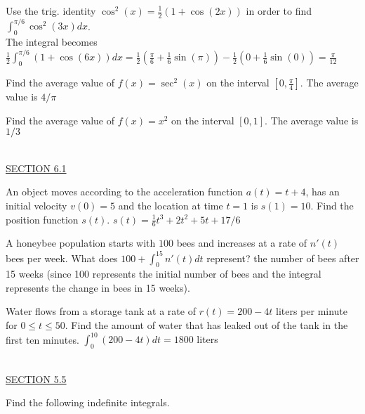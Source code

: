 \documentclass{exam}
\begin{document}
\begin{questions}
\question Use the trig. identity $\cos^2(x) = \frac{1}{2}\left( 1 + \cos(2x) \right)$ in order to find $\displaystyle\int_0^{\pi/6} \cos^2(3x) dx$.
\\  {\color{red} The integral becomes $\frac{1}{2}\displaystyle\int_0^{\pi/6} \left( 1 + \cos(6x) \right) dx  = \frac{1}{2} \left( \frac{\pi}{6} + \frac{1}{6}\sin(\pi)\right) - \frac{1}{2} \left( 0 + \frac{1}{6}\sin(0)\right) = \frac{\pi}{12} $}

\question Find the average value of $f(x)=\sec^2(x)$ on the interval $\left[ 0, \frac{\pi}{4} \right]$.  
 {\color{red}  The average value is $4/\pi$}

\question Find the average value of $f(x) = x^2$ on the interval $[0,1]$.  {\color{red} The average value is $1/3$}

    \newpage\thispagestyle{empty}
\ \\  
  \underline{SECTION 6.1}

\question An object moves according to the acceleration function $a(t)=t+4$, has an initial velocity $v(0)=5$ and the location at time $t=1$ is $s(1)=10$.  Find the position function $s(t)$. 
 {\color{red} $s(t)=\frac{1}{6}t^3+2t^2+5t+17/6$}

\question A honeybee population starts with $100$ bees and increases at a rate of $n'(t)$ bees per week.  What does $100+\displaystyle\int_0^{15}n'(t)dt$ represent? 
 {\color{red} the number of bees after 15 weeks (since 100 represents the initial number of bees and the integral represents the change in bees in 15 weeks).}

\question Water flows from a storage tank at a rate of $r(t)=200-4t$ liters per minute for $0\leq t\leq 50$.  Find the amount of water that has leaked out of the tank in the first ten minutes. {\color{red} $\displaystyle\int_0^{10} (200-4t)dt=1800$ liters}

\ \\
\underline{SECTION 5.5}

\question Find the following indefinite integrals.
  \begin{parts}
\end{parts}
\end{questions}
\end{document}
